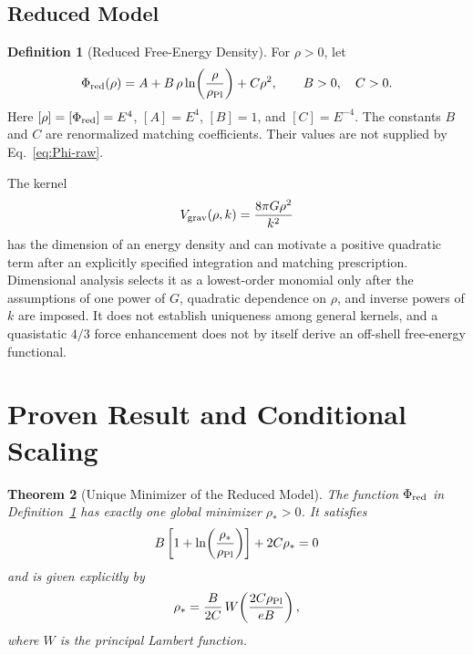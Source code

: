 \documentclass[12pt,a4paper]{article}
\theoremstyle{definition}
\newtheorem{definition}{Definition}[section]
\theoremstyle{plain}
\newtheorem{theorem}[definition]{Theorem}
\theoremstyle{remark}
\begin{document}
\subsection{Reduced Model}

\begin{definition}[Reduced Free-Energy Density]\label{def:functional}
For \(\rho>0\), let
\begin{equation}\label{eq:Phi}
 \Phi_{\rm red}(\rho)
 =A+B\,\rho\ln\!\left(\frac{\rho}{\rho_{\rm Pl}}\right)+C\rho^2 ,
 \qquad B>0,\quad C>0 .
\end{equation}
Here \([\rho]=[\Phi_{\rm red}]=E^4\), \([A]=E^4\), \([B]=1\), and
\([C]=E^{-4}\).  The constants \(B\) and \(C\) are renormalized matching
coefficients.  Their values are not supplied by Eq.~\eqref{eq:Phi-raw}.
\end{definition}

The kernel
\begin{equation}\label{eq:Vgrav}
 V_{\rm grav}(\rho,k)=\frac{8\pi G\rho^2}{k^2}
\end{equation}
has the dimension of an energy density and can motivate a positive quadratic
term after an explicitly specified integration and matching prescription.
Dimensional analysis selects it as a lowest-order monomial only after the
assumptions of one power of \(G\), quadratic dependence on \(\rho\), and
inverse powers of \(k\) are imposed.  It does not establish uniqueness among
general kernels, and a quasistatic \(4/3\) force enhancement does not by itself
derive an off-shell free-energy functional.

\section{Proven Result and Conditional Scaling}\label{sec:main}

\begin{theorem}[Unique Minimizer of the Reduced Model]\label{thm:main}
The function \(\Phi_{\rm red}\) in Definition~\ref{def:functional} has exactly
one global minimizer \(\rho_\ast>0\).  It satisfies
\begin{equation}\label{eq:stationarity}
 B\left[1+\ln\!\left(\frac{\rho_\ast}{\rho_{\rm Pl}}\right)\right]
 +2C\rho_\ast=0
\end{equation}
and is given explicitly by
\begin{equation}\label{eq:rho-lambert}
 \rho_\ast=\frac{B}{2C}\,
 W\!\left(\frac{2C\rho_{\rm Pl}}{eB}\right),
\end{equation}
where \(W\) is the principal Lambert function.
\end{theorem}
\end{document}
